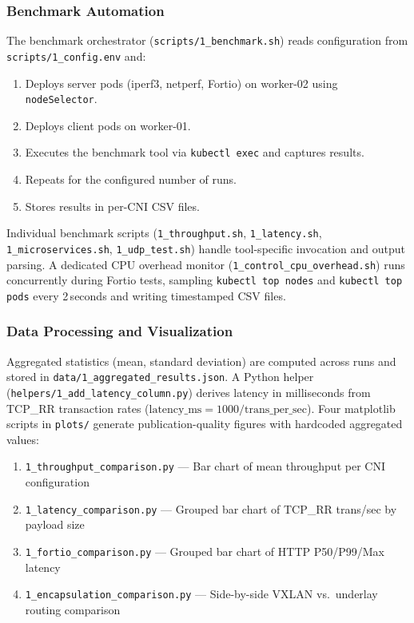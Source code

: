 \documentclass[11pt,a4paper]{article}
\begin{document}
\subsubsection{Benchmark Automation}

The benchmark orchestrator (\texttt{scripts/1\_benchmark.sh}) reads configuration from \texttt{scripts/1\_config.env} and:
\begin{enumerate}
  \item Deploys server pods (iperf3, netperf, Fortio) on worker-02 using \texttt{nodeSelector}.
  \item Deploys client pods on worker-01.
  \item Executes the benchmark tool via \texttt{kubectl exec} and captures results.
  \item Repeats for the configured number of runs.
  \item Stores results in per-CNI CSV files.
\end{enumerate}

Individual benchmark scripts (\texttt{1\_throughput.sh}, \texttt{1\_latency.sh}, \texttt{1\_micro\-services.sh}, \texttt{1\_udp\_test.sh}) handle tool-specific invocation and output parsing. A dedicated CPU overhead monitor (\texttt{1\_control\_cpu\_over\-head.sh}) runs concurrently during Fortio tests, sampling \texttt{kubectl top nodes} and \texttt{kubectl top pods} every 2\,seconds and writing timestamped CSV files.

\subsubsection{Data Processing and Visualization}

Aggregated statistics (mean, standard deviation) are computed across runs and stored in \texttt{data/1\_aggregated\_results.json}. A Python helper (\texttt{helpers/1\_add\_latency\_column.py}) derives latency in milliseconds from TCP\_RR transaction rates ($\text{latency\_ms} = 1000 / \text{trans\_per\_sec}$). Four matplotlib scripts in \texttt{plots/} generate publication-quality figures with hardcoded aggregated values:
\begin{enumerate}
  \item \texttt{1\_throughput\_comparison.py} --- Bar chart of mean throughput per CNI configuration
  \item \texttt{1\_latency\_comparison.py} --- Grouped bar chart of TCP\_RR trans/sec by payload size
  \item \texttt{1\_fortio\_comparison.py} --- Grouped bar chart of HTTP P50/P99/Max latency
  \item \texttt{1\_encapsulation\_comparison.py} --- Side-by-side VXLAN vs.\ underlay routing comparison
\end{enumerate}
\end{document}
